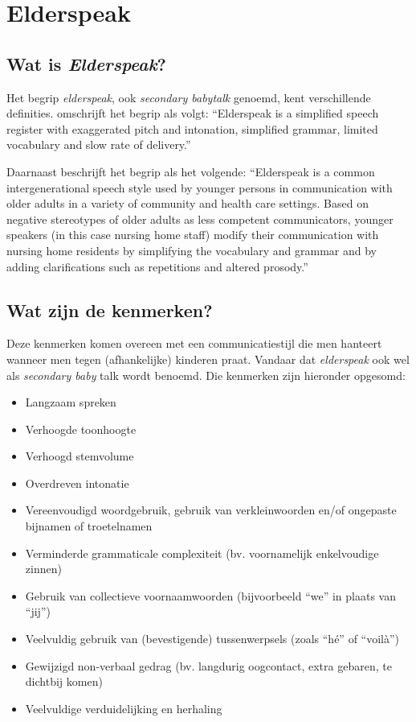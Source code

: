 \section{Elderspeak}

\subsection{Wat is \textit{Elderspeak}?}

Het begrip \textit{elderspeak}, ook \textit{secondary babytalk} genoemd, kent verschillende definities. \textcite{Kemper_1998} omschrijft het begrip als volgt:
``Elderspeak is a simplified speech register with exaggerated pitch and intonation, simplified grammar, limited vocabulary and slow rate of delivery.''

Daarnaast beschrijft \textcite{Williams2011} het begrip als het volgende:
``Elderspeak is a common intergenerational speech style used by younger persons in communication with older adults in a variety of community and health care settings. Based on negative stereotypes of older adults as less competent communicators, younger speakers (in this case nursing home staff) modify their communication with nursing home residents by simplifying the vocabulary and grammar and by adding clarifications such as repetitions and altered prosody.''

\subsection{Wat zijn de kenmerken?}
Deze kenmerken komen overeen met een communicatiestijl die men hanteert wanneer men tegen (afhankelijke) kinderen praat. Vandaar dat \textit{elderspeak} ook wel als \textit{secondary baby} talk wordt benoemd. Die kenmerken zijn hieronder opgesomd:

\begin{itemize}
    \item Langzaam spreken
    \item Verhoogde toonhoogte
    \item Verhoogd stemvolume
    \item Overdreven intonatie
    \item Vereenvoudigd woordgebruik, gebruik van verkleinwoorden en/of ongepaste bijnamen of troetelnamen
    \item Verminderde grammaticale complexiteit (bv. voornamelijk enkelvoudige zinnen)
    \item Gebruik van collectieve voornaamwoorden (bijvoorbeeld ``we'' in plaats van ``jij'')
    \item Veelvuldig gebruik van (bevestigende) tussenwerpsels (zoals ``hé'' of ``voilà'')
    \item Gewijzigd non-verbaal gedrag (bv. langdurig oogcontact, extra gebaren, te dichtbij komen)
    \item Veelvuldige verduidelijking en herhaling
\end{itemize}
\autocite{Campens21}

